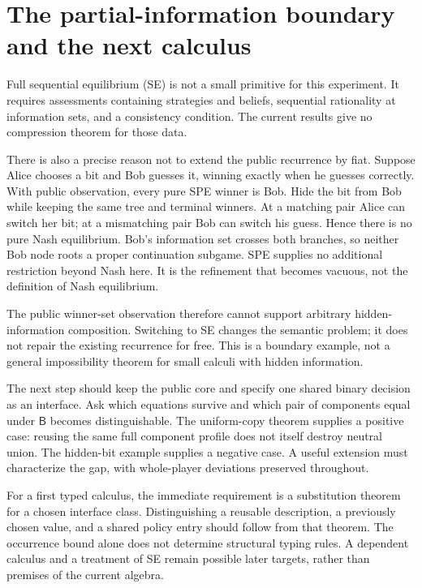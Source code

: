 \documentclass[11pt]{article}
\newcommand{\B}{\mathsf B}
\begin{document}
\section{The partial-information boundary and the next calculus}

Full sequential equilibrium (SE) is not a small primitive for this
experiment. It requires assessments containing strategies and beliefs,
sequential rationality at information sets, and a consistency condition.
The current results give no compression theorem for those data.

There is also a precise reason not to extend the public recurrence by
fiat. Suppose Alice chooses a bit and Bob guesses it, winning exactly
when he guesses correctly. With public observation, every pure SPE
winner is Bob. Hide the bit from Bob while keeping the same tree and
terminal winners. At a matching pair Alice can switch her bit; at a
mismatching pair Bob can switch his guess. Hence there is no pure Nash
equilibrium. Bob's information set crosses both branches, so neither
Bob node roots a proper continuation subgame. SPE supplies no additional
restriction beyond Nash here. It is the refinement that becomes vacuous,
not the definition of Nash equilibrium.

The public winner-set observation therefore cannot support arbitrary
hidden-information composition. Switching to SE changes the semantic
problem; it does not repair the existing recurrence for free. This is a
boundary example, not a general impossibility theorem for small calculi
with hidden information.

The next step should keep the public core and specify one shared binary
decision as an interface. Ask which equations survive and which pair of
components equal under $\B$ becomes distinguishable. The uniform-copy
theorem supplies a positive case: reusing the same full component profile
does not itself destroy neutral union. The hidden-bit example supplies a
negative case. A useful extension must characterize the gap, with
whole-player deviations preserved throughout.

For a first typed calculus, the immediate requirement is a substitution
theorem for a chosen interface class. Distinguishing a reusable
description, a previously chosen value, and a shared policy entry should
follow from that theorem. The occurrence bound alone does not determine
structural typing rules. A dependent calculus and a treatment of SE remain
possible later targets, rather than premises of the current algebra.
\end{document}
